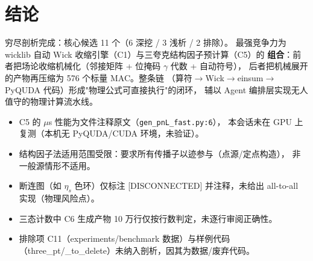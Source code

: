 \documentclass[UTF8]{ctexart}
\begin{document}
\section{结论}
\begin{conclbox}
穷尽剖析完成：核心候选 11 个（\textcolor{algo}{6 深挖 / 3 浅析 / 2 排除}）。
最强竞争力为 wicklib 自动 Wick 收缩引擎（C1）与三夸克结构因子预计算（C5）的
\textbf{组合}：前者把场论收缩机械化（邻接矩阵 + 位掩码 $\gamma$ 代数 + 自动符号），
后者把机械展开的产物再压缩为 576 个标量 MAC。整条链
（算符$\to$Wick$\to$einsum$\to$PyQUDA 代码）形成"物理公式可直接执行"的闭环，
辅以 Agent 编排层实现无人值守的物理计算流水线。
\end{conclbox}
\begin{warnbox}
\begin{itemize}
\item C5 的 $\mu$s 性能为文件注释原文（\nolinkurl{gen_pnL_fast.py:6}），
本会话未在 GPU 上复测（本机无 PyQUDA/CUDA 环境，\textcolor{warn}{未验证}）。
\item 结构因子法适用范围受限：要求所有传播子以迹参与（点源/定点构造），
非一般源情形不适用。
\item 断连图（如 $\eta_s$ 色环）仅标注 [DISCONNECTED] 并注释，未给出
all-to-all 实现（物理风险点）。
\item 三态计数中 C6 生成产物 10 万行仅按行数判定，未逐行审阅正确性。
\item 排除项 C11（experiments/benchmark 数据）与样例代码
（three\_pt/\_to\_delete）未纳入剖析，因其为数据/废弃代码。
\end{itemize}
\end{warnbox}
\end{document}
